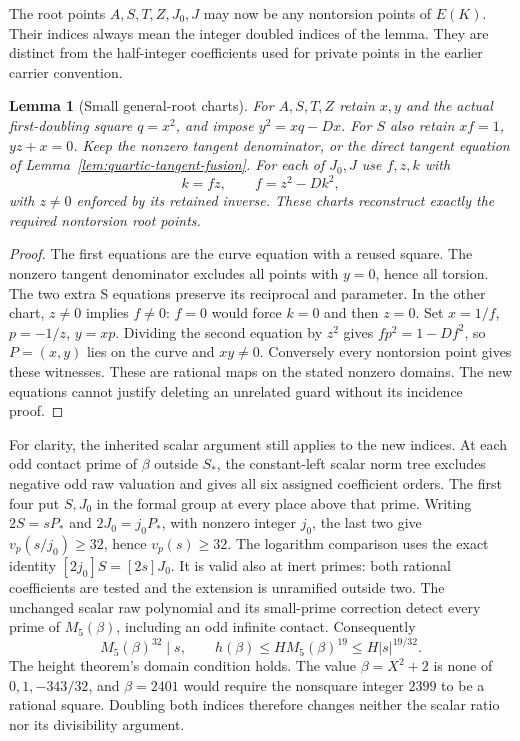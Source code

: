 \documentclass[11pt]{article}
\newtheorem{lemma}[theorem]{Lemma}
\theoremstyle{definition}
\theoremstyle{remark}
\begin{document}
The root points $A,S,T,Z,J_0,J$ may now be any nontorsion points of $E(K)$.
Their indices always mean the integer doubled indices of the lemma. They
are distinct from the half-integer coefficients used for private points
in the earlier carrier convention.

\begin{lemma}[Small general-root charts]
\label{lem:quartic-general-root-charts}
For $A,S,T,Z$ retain $x,y$ and the actual first-doubling square $q=x^2$,
and impose $y^2=xq-Dx$. For $S$ also retain $xf=1$, $yz+x=0$.
Keep the nonzero tangent denominator, or the direct tangent
equation of Lemma~\ref{lem:quartic-tangent-fusion}. For each of $J_0,J$
use $f,z,k$ with
\[
 k=fz,\qquad f=z^2-Dk^2,
\]
with $z\ne0$ enforced by its retained inverse. These charts reconstruct exactly
the required nontorsion root points.
\end{lemma}
\begin{proof}
The first equations are the curve equation with a reused square. The
nonzero tangent denominator excludes all points with $y=0$, hence all
torsion. The two extra S equations preserve its reciprocal and parameter.
In the other chart, $z\ne0$ implies $f\ne0$: $f=0$ would force $k=0$
and then $z=0$. Set $x=1/f$, $p=-1/z$, $y=xp$. Dividing the second
equation by $z^2$ gives $fp^2=1-Df^2$, so $P=(x,y)$ lies on the curve
and $xy\ne0$. Conversely every nontorsion point gives these witnesses.
These are rational maps on the stated nonzero domains. The new equations
cannot justify deleting an unrelated guard without its incidence proof.
\end{proof}

For clarity, the inherited scalar argument still applies to the new
indices. At each odd contact prime of $\beta$ outside $S_*$, the
constant-left scalar norm tree excludes negative odd raw valuation and
gives all six assigned coefficient orders. The first four put $S,J_0$
in the formal group at every place above that prime. Writing
$2S=sP_*$ and $2J_0=j_0P_*$, with nonzero integer $j_0$, the last two
give $v_p(s/j_0)\ge32$, hence $v_p(s)\ge32$. The logarithm comparison
uses the exact identity $[2j_0]S=[2s]J_0$. It is valid also at inert
primes: both rational coefficients are tested and the extension is
unramified outside two. The unchanged scalar raw polynomial and its
small-prime correction detect every prime of $M_5(\beta)$, including
an odd infinite contact. Consequently
\[
 M_5(\beta)^{32}\mid s,\qquad
 h(\beta)\le H M_5(\beta)^{19}\le H|s|^{19/32}.
\]
The height theorem's domain condition holds. The value $\beta=X^2+2$
is none of $0,1,-343/32$, and $\beta=2401$ would require the nonsquare
integer $2399$ to be a rational square. Doubling both indices therefore
changes neither the scalar ratio nor its divisibility argument.
\end{document}
